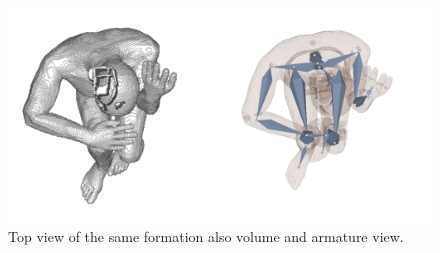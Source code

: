 \begin{figure} [htb!]
    \centering
	\includegraphics[width=13cm]{content/images/results/man2Top.png}
	\caption{Top view of the same formation also volume and armature view.}
	\label{fig:}
\end{figure}

